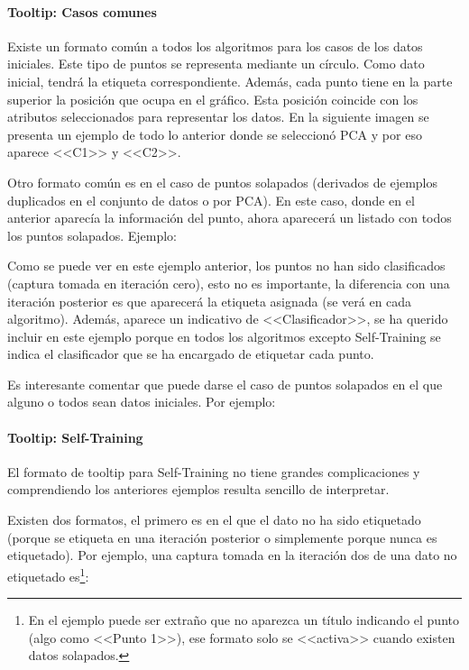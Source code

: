 \paragraph{Tooltip: Casos comunes}

Existe un formato común a todos los algoritmos para los casos de los datos
iniciales. Este tipo de puntos se representa mediante un círculo. Como dato
inicial, tendrá la etiqueta correspondiente. Además, cada punto tiene en la
parte superior la posición que ocupa en el gráfico. Esta posición coincide con
los atributos seleccionados para representar los datos. En la siguiente imagen
se presenta un ejemplo de todo lo anterior donde se seleccionó PCA y por eso
aparece <<C1>> y <<C2>>.


Otro formato común es en el caso de puntos solapados (derivados de ejemplos
duplicados en el conjunto de datos o por PCA). En este caso, donde en el anterior
aparecía la información del punto, ahora aparecerá un listado con todos los
puntos solapados. Ejemplo:


Como se puede ver en este ejemplo anterior, los puntos no han sido clasificados
(captura tomada en iteración cero), esto no es importante, la diferencia con una
iteración posterior es que aparecerá la etiqueta asignada (se verá en cada
algoritmo). Además, aparece un indicativo de <<Clasificador>>, se ha querido
incluir en este ejemplo porque en todos los algoritmos excepto Self-Training se
indica el clasificador que se ha encargado de etiquetar cada punto.

Es interesante comentar que puede darse el caso de puntos solapados en el que
alguno o todos sean datos iniciales. Por ejemplo:


\paragraph{Tooltip: Self-Training}

El formato de tooltip para Self-Training no tiene grandes complicaciones y
comprendiendo los anteriores ejemplos resulta sencillo de interpretar.

Existen dos formatos, el primero es en el que el dato no ha sido etiquetado
(porque se etiqueta en una iteración posterior o simplemente porque nunca es
etiquetado). Por ejemplo, una captura tomada en la iteración dos de una dato no
etiquetado es\footnote{En el ejemplo puede ser extraño que no aparezca un título
indicando el punto (algo como <<Punto 1>>), ese formato solo se <<activa>>
cuando existen datos solapados.}:

